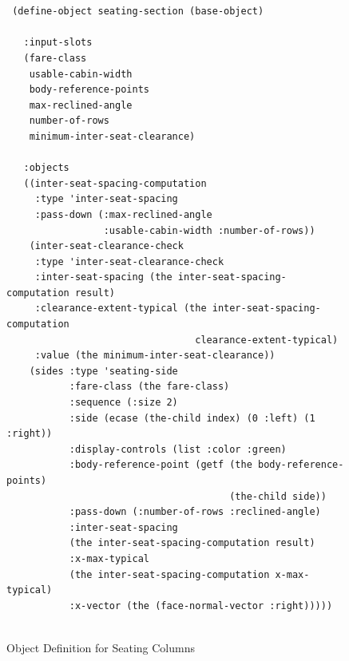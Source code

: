 \documentclass [11pt]{book}
\begin{document}
\begin{figure}
\begin{lrbox}{\boxedverb}
\begin{minipage}{\linewidth}

\begin{verbatim}


 (define-object seating-section (base-object)

   :input-slots
   (fare-class
    usable-cabin-width
    body-reference-points
    max-reclined-angle
    number-of-rows
    minimum-inter-seat-clearance)

   :objects
   ((inter-seat-spacing-computation 
     :type 'inter-seat-spacing
     :pass-down (:max-reclined-angle 
                 :usable-cabin-width :number-of-rows))
    (inter-seat-clearance-check 
     :type 'inter-seat-clearance-check
     :inter-seat-spacing (the inter-seat-spacing-computation result)
     :clearance-extent-typical (the inter-seat-spacing-computation
                                 clearance-extent-typical)
     :value (the minimum-inter-seat-clearance))
    (sides :type 'seating-side
           :fare-class (the fare-class)
           :sequence (:size 2)
           :side (ecase (the-child index) (0 :left) (1 :right))
           :display-controls (list :color :green)
           :body-reference-point (getf (the body-reference-points) 
                                       (the-child side))
           :pass-down (:number-of-rows :reclined-angle)
           :inter-seat-spacing 
           (the inter-seat-spacing-computation result)
           :x-max-typical 
           (the inter-seat-spacing-computation x-max-typical)
           :x-vector (the (face-normal-vector :right)))))
      
\end{verbatim}
\end{minipage}
\end{lrbox}
\fbox{\usebox{\boxedverb}}

\caption{Object Definition for Seating Columns}

\label{code:school-bus-seating-section}

\end{figure}
\end{document}
